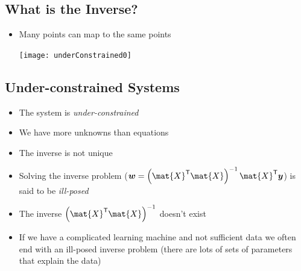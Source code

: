 \documentclass[25pt,landscape,footrule]{foils}
\begin{document}
\begin{slide}
\section[-2]{What is the Inverse?}

\pb
  \begin{itemize}
  \item Many points can map to the same points\pause
    \begin{center}
      \texttt{[image: underConstrained0]}
    \end{center}
  \end{itemize}

\end{slide}


\begin{slide}
\section[-1]{Under-constrained Systems}

\begin{PauseHighLight}
  \begin{itemize}
  \item The system is \emph{under-constrained}\pause
  \item We have more unknowns than equations\pause
  \item The inverse is not unique\pause
  \item Solving the inverse problem ($\bm{w} =
    \left(\mat{X}^\tr\mat{X}\right)^{-1} \mat{X}^\tr \bm{y}$) is said 
    to be \emph{ill-posed}\pause
  \item The inverse $\left(\mat{X}^\tr\mat{X}\right)^{-1}$ doesn't
    exist\pause 
  \item If we have a complicated learning machine and not sufficient
    data we often end with an ill-posed inverse problem (there are lots
    of sets of parameters that explain the data)\pause
  \end{itemize}
\end{PauseHighLight}

\end{slide}


\end{document}
